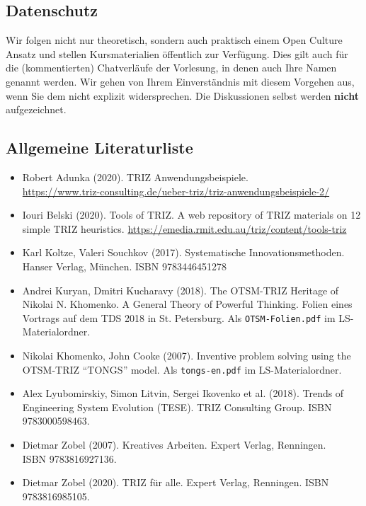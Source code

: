 \documentclass[11pt,a4paper]{article}
\begin{document}
\subsection{Datenschutz}

Wir folgen nicht nur theoretisch, sondern auch praktisch einem Open Culture
Ansatz und stellen Kursmaterialien öffentlich zur Verfügung.  Dies gilt auch
für die (kommentierten) Chatverläufe der Vorlesung, in denen auch Ihre Namen
genannt werden.  Wir gehen von Ihrem Einverständnis mit diesem Vorgehen aus,
wenn Sie dem nicht explizit widersprechen.  Die Diskussionen selbst werden
\textbf{nicht} aufgezeichnet.

\subsection{Allgemeine Literaturliste}
\begin{itemize}[noitemsep]
\item Robert Adunka (2020). TRIZ Anwendungsbeispiele. \\
  \url{https://www.triz-consulting.de/ueber-triz/triz-anwendungsbeispiele-2/} 
\item Iouri Belski (2020). Tools of TRIZ. A web repository of TRIZ materials
  on 12 simple TRIZ heuristics.
  \url{https://emedia.rmit.edu.au/triz/content/tools-triz}
\item Karl Koltze, Valeri Souchkov (2017). Systematische Innovationsmethoden.
  Hanser Verlag, München. ISBN 9783446451278
\item Andrei Kuryan, Dmitri Kucharavy (2018). The OTSM-TRIZ Heritage of
  Nikolai N. Khomenko. A General Theory of Powerful Thinking. Folien eines
  Vortrags auf dem TDS 2018 in St. Petersburg. Als \texttt{OTSM-Folien.pdf} im
  LS-Materialordner.
\item Nikolai Khomenko, John Cooke (2007). Inventive problem solving using the
  OTSM-TRIZ “TONGS” model.  Als \texttt{tongs-en.pdf} im LS-Materialordner.
\item Alex Lyubomirskiy, Simon Litvin, Sergei Ikovenko et al. (2018). Trends
  of Engineering System Evolution (TESE).  TRIZ Consulting Group. ISBN
  9783000598463.
\item Dietmar Zobel (2007). Kreatives Arbeiten. Expert Verlag, Renningen.\\
  ISBN 9783816927136.
\item Dietmar Zobel (2020). TRIZ für alle. Expert Verlag, Renningen. ISBN
  9783816985105.
\end{itemize}
\end{document}
